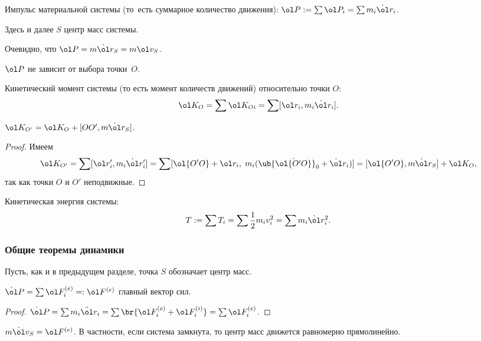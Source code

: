 \documentclass[a4paper,12pt]{article}
\def\F{\ol F}
\def\r{\ol r}
\def\v{\ol v}
\def\K{\ol K_O}
\def\P{\ol P}
\def\dd{\ddot}
\def\d{\dot}
\begin{document}
\begin{df}
Импульс материальной системы (то~есть суммарное количество движения): $\P:=\sum\P_i=\sum m_i\d\r_i$.
\end{df}

Здесь и далее $S$ центр масс системы.

\begin{stm}
Очевидно, что $\P=m\d\r_S=m\v_S$.
\end{stm}

\begin{imp}
$\P$ не зависит от выбора точки~$O$.
\end{imp}

\begin{df}
Кинетический момент системы (то есть момент количеств движений) относительно точки $O$:
$$\K=\sum\ol K_{Oi}=\sum[\r_i,m_i\d\r_i].$$
\end{df}

\begin{stm}
$\ol K_{O'}=\ol K_O+[OO',m\d\r_S]$.
\end{stm}

\begin{proof}
Имеем
$$\ol K_{O'}=\sum[\r_i',m_i\d\r_i']=
\sum[\ol{O'O}+\r_i,\; m_i(\ub{\d{\ol{O'O}}}_0+\d\r_i)]=[\ol{O'O},m\d\r_S]+\K,$$
так как точки $O$ и $O'$ неподвижные.
\end{proof}

\begin{df}
Кинетическая энергия системы:
$$T:=\sum T_i=\sum\frac12m_iv_i^2=\sum m_i\d\r_i^2.$$
\end{df}

\subsubsection{Общие теоремы динамики}

Пусть, как и в предыдущем разделе, точка $S$ обозначает центр масс.

\begin{theorem}
$\d\P=\sum\F_i^{(e)}=:\F^{(e)}$ главный вектор сил.
\end{theorem}

\begin{proof}
$\d\P=\sum m_i\dd\r_i=\sum \br{\F_i^{(e)}+\F_i^{(i)}}=\sum \F_i^{(e)}$.
\end{proof}

\begin{imp}
$m\d\v_S=\F^{(e)}$.
В частности, если система замкнута, то центр масс движется равномерно прямолинейно.
\end{imp}
\end{document}
